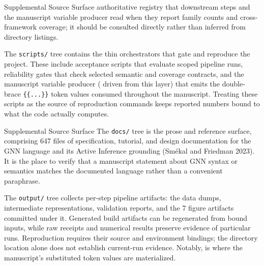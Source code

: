 \documentclass[
  ignorenonframetext,
]{beamer}
\begin{document}
\begin{frame}{Supplemental Source Surface}
authoritative registry that downstream steps and the manuscript variable
producer read when they report family counts and cross-framework
coverage; it should be consulted directly rather than inferred from
directory listings.

The \texttt{scripts/} tree contains the thin orchestrators that gate and
reproduce the project. These include acceptance scripts that evaluate
scoped pipeline runs, reliability gates that check selected semantic and
coverage contracts, and the manuscript variable producer
( driven from this layer) that
emits the double-brace \texttt{\{\{...\}\}} token values consumed
throughout the manuscript. Treating these scripts as the source of
reproduction commands keeps reported numbers bound to what the code
actually computes.

\end{frame}

\begin{frame}{Supplemental Source Surface}
The \texttt{docs/} tree is the prose and reference surface, comprising
647 files of specification, tutorial, and design documentation for the
GNN language and its Active Inference grounding (Smékal and Friedman
2023). It is the place to verify that a manuscript statement about GNN
syntax or semantics matches the documented language rather than a
convenient paraphrase.

The \texttt{output/} tree collects per-step pipeline artifacts: the data
dumps, intermediate representations, validation reports, and the 7
figure artifacts committed under it. Generated build artifacts can be
regenerated from bound inputs, while raw receipts and numerical results
preserve evidence of particular runs. Reproduction requires their source
and environment bindings; the directory location alone does not
establish current-run evidence. Notably,
 is where the
manuscript's substituted token values are materialized.
\end{frame}
\end{document}
